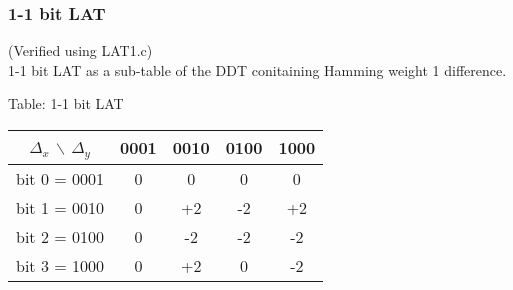 \documentclass{article}
\begin{document}
\subsubsection{1-1 bit LAT}
(Verified using LAT1.c)\\
1-1 bit LAT as a sub-table of the DDT conitaining Hamming weight 1 difference.\\
\begin{center}
	Table: 1-1 bit LAT\\
\begin{tabular}{|c|c|c|c|c|}
	\hline
	$\Delta_x$ $\backslash$ $\Delta_y$  &0001 &0010 & 0100 & 1000\\
	\hline
	bit 0 = 0001 &0&0 &0 &0 \\
	\hline
	bit 1 = 0010 &0&+2 &-2 &+2 \\
	\hline
	bit 2 = 0100 &0&-2 &-2 &-2 \\
	\hline
	bit 3 = 1000&0&+2 &0 &-2 \\
	\hline
\end{tabular}\\
\end{center}
\end{document}
